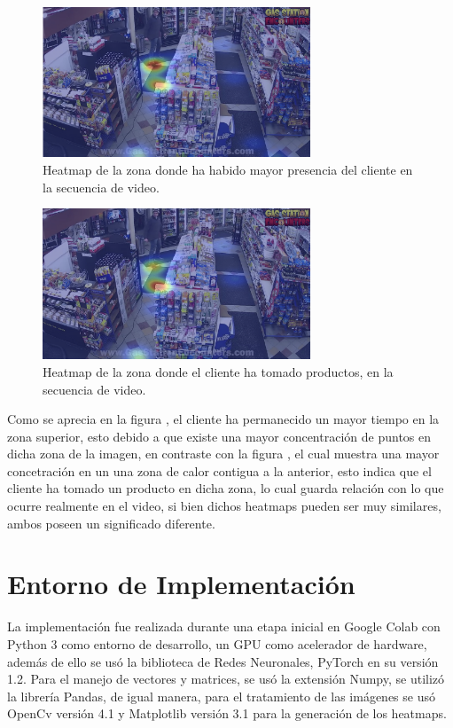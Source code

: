 \documentclass[conference]{IEEEtran}
\begin{document}
\begin{figure}[hbtp]
\centering
\includegraphics[width=8cm]{../Recursos/video4/video4_yolo_heatmap.png}
\caption{Heatmap de la zona donde ha habido mayor presencia del cliente en la secuencia de video.}
\label{fig:video4_yolo_heatmap}
\end{figure}

\begin{figure}[hbtp]
\centering
\includegraphics[width=8cm]{../Recursos/video4/video4_hrnet_heatmap.png}
\caption{Heatmap de la zona donde el cliente ha tomado productos, en la secuencia de video.}
\label{fig:video4_hrnet_heatmap}
\end{figure}


Como se aprecia en la figura \cite{fig:video4_yolo_heatmap}, el cliente ha permanecido un mayor tiempo en la zona superior, esto debido a que existe una mayor concentración de puntos en dicha zona de la imagen, en contraste con la figura \cite{fig:video4_hrnet_heatmap}, el cual muestra una mayor concetración en un una zona de calor contigua a la anterior, esto indica que el cliente ha tomado un producto en dicha zona, lo cual guarda relación con lo que ocurre realmente en el video, si bien dichos heatmaps pueden ser muy similares, ambos poseen un significado diferente.


\section{Entorno de Implementación}
La implementación fue realizada durante una etapa inicial en Google Colab con Python 3 como entorno de desarrollo, un GPU como acelerador de hardware, además de ello se usó  la biblioteca de Redes Neuronales, PyTorch en su versión 1.2. Para el manejo de vectores y matrices, se usó la extensión Numpy, se utilizó la librería Pandas, de igual manera, para el tratamiento de las imágenes se usó OpenCv versión 4.1 y Matplotlib versión 3.1 para la generación de los heatmaps.
\end{document}
